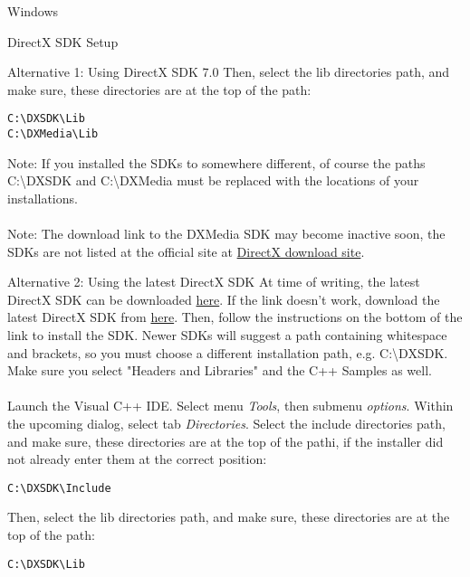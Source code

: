 \begin{section}{Windows}
\begin{subsection}{DirectX SDK Setup}
\begin{subsubsection}{Alternative 1: Using DirectX SDK 7.0}
Then, select the lib directories path, and make sure, these directories are at the top of the path:\\
\begin{verbatim}
C:\DXSDK\Lib
C:\DXMedia\Lib
\end{verbatim}

Note: If you installed the SDKs to somewhere different, of course the paths C:\textbackslash{}DXSDK and C:\textbackslash{}DXMedia must be replaced with the locations of your installations.\\
\\
Note: The download link to the DXMedia SDK may become inactive soon, the SDKs are not listed at the official site at \href{http://www.microsoft.com/downloads/details.aspx?FamilyId=FD044A42-9912-42A3-9A9E-D857199F888E&displaylang=en}{DirectX download site}.
\end{subsubsection}%
\begin{subsubsection}{Alternative 2: Using the latest DirectX SDK}
At time of writing, the latest DirectX SDK can be downloaded \href{http://www.microsoft.com/downloads/details.aspx?FamilyId=FD044A42-9912-42A3-9A9E-D857199F888E\&displaylang=en}{here}. If the link doesn't work, download the latest DirectX SDK from \href{http://www.microsoft.com/downloads/details.aspx?FamilyId=FD044A42-9912-42A3-9A9E-D857199F888E&displaylang=en}{here}.
Then, follow the instructions on the bottom of the link to install the SDK. Newer SDKs will suggest a path containing whitespace and brackets, so you must choose a different installation path, e.g. C:\textbackslash{}DXSDK.
Make sure you select "Headers and Libraries" and the C++ Samples as well.\\
\\
Launch the Visual C++ IDE. Select menu \textit{Tools}, then submenu \textit{options}. Within the upcoming dialog, select tab \textit{Directories}. Select the include directories path, and make sure, these directories are at the top of the pathi, if the installer did not already enter them at the correct position:\\
\begin{verbatim}
C:\DXSDK\Include
\end{verbatim}

Then, select the lib directories path, and make sure, these directories are at the top of the path:\\
\begin{verbatim}
C:\DXSDK\Lib
\end{verbatim}


\end{subsubsection}
\end{subsection}
\end{section}
